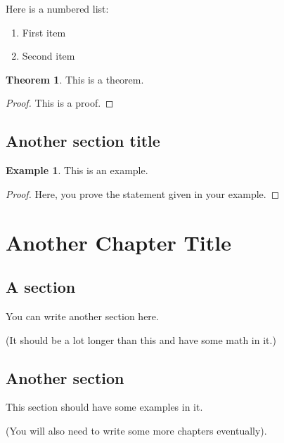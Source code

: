 \documentclass[12pt]{article} %
\theoremstyle{definition}
\newtheorem{example}{Example}[section]
\newtheorem{theorem}{Theorem}
\begin{document}
Here is a numbered list:
\begin{enumerate} %
	\item First item
	\item Second item
\end{enumerate}

\begin{theorem}
This is a theorem.
\end{theorem}

\begin{proof}
 This is a proof.
 \end{proof}

\subsection{Another section title}

\begin{example}
This is an example.
\end{example}

\begin{proof}
Here, you prove the statement given in your example.
\end{proof}

\newpage %

\section{Another Chapter Title}

\subsection{A section}

You can write another section here.

\medskip

\noindent (It should be a lot longer than this and have some math in it.)

\subsection{Another section}

This section should have some examples in it. 

\bigskip

\noindent (You will also need to write some more chapters eventually).
\end{document}

